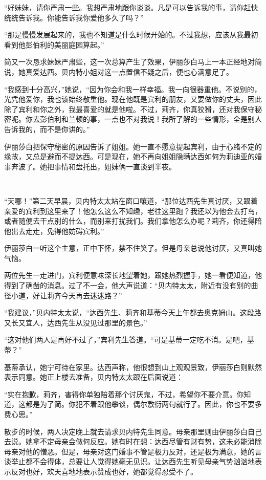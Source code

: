 \par “好妹妹，请你严肃一些。我想严肃地跟你谈谈。凡是可以告诉我的事，请你赶快统统告诉我。你能告诉我你爱他多久了吗？”
\par “那是慢慢发展起来的，我也不知道是什么时候开始的。不过我想，应该从我最初看到他彭伯利的美丽庭园算起。”
\par 简又一次恳求妹妹严肃些，这一次总算产生了效果，伊丽莎白马上一本正经地对简说，她真爱达西。贝内特小姐对这一点置信不疑之后，便也心满意足了。
\par “我感到十分高兴，”她说，“因为你会和我一样幸福。我一向很器重他。不说别的，光凭他爱你，我也该始终敬重他。现在他既是宾利的朋友，又要做你的丈夫，因此除了宾利和你之外，我最喜爱的就是他啦。不过，莉齐，你真狡猾，还对我保守秘密呢。你去彭伯利和兰顿的事，一点也不对我说！我所了解的一些情形，全是别人告诉我的，而不是你讲的。”
\par 伊丽莎白把保守秘密的原因告诉了姐姐。她一直不愿意提起宾利，由于心绪不定的缘故，又总是避而不提达西。可是现在，她不再向姐姐隐瞒达西如何为莉迪亚的婚事奔波了。她把事情和盘托出，姐妹俩一直谈到半夜。
\par  
\par “天哪！”第二天早晨，贝内特太太站在窗口嚷道，“那位达西先生真讨厌，又跟着亲爱的宾利到这里来了！他怎么这么不知趣，老往这里跑？我还以为他会去打鸟，或者随便去干点别的什么，而别来打扰我们。我们拿他怎么办呢？莉齐，你还得陪他出去走走，免得他妨碍宾利。”
\par 伊丽莎白一听这个主意，正中下怀，禁不住笑了。但是母亲总说他讨厌，又真叫她气恼。
\par 两位先生一走进门，宾利便意味深长地望着她，跟她热烈握手，她一看便知道，他得到了确凿的消息。过了不一会，他大声说道：“贝内特太太，附近有没有别的曲径小道，好让莉齐今天再去迷迷路？”
\par “我建议，”贝内特太太说，“达西先生、莉齐和基蒂今天上午都去奥克姆山。这段路又长又宜人，达西先生从没见过那里的景色。”
\par “这对他们两人是再好不过了，”宾利先生答道。“可是基蒂一定吃不消。是吧，基蒂？”
\par 基蒂承认，她宁可待在家里。达西声称，他很想到山上观观景致，伊丽莎白则默然表示同意。她正上楼去准备，贝内特太太跟在后面说道：
\par “实在抱歉，莉齐，害得你单独陪着那个讨厌鬼，不过，希望你不要介意。你知道，这都是为了简。你犯不着跟他攀谈，偶尔敷衍两句就行了。因此，你也不要多费心思。”
\par 散步的时候，两人决定晚上就去请求贝内特先生同意。母亲那里则由伊丽莎白自己去说。她拿不定母亲会做何反应。她有时在想：达西尽管有财有势，这未必能消除母亲对他的憎恶。但是，母亲对这门婚事不管是极力反对，还是极为满意，她的言谈举止都不会得体，总要让人觉得她毫无见识。让达西先生听见母亲气势汹汹地表示反对也好，欢天喜地地表示赞成也好，她都觉得忍受不了。
